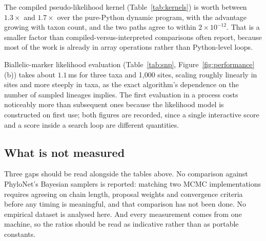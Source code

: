 The compiled pseudo-likelihood kernel (Table~\ref{tab:kernels}) is worth
between $1.3\times$ and $1.7\times$ over the pure-Python dynamic program, with
the advantage growing with taxon count, and the two paths agree to within
$2 \times 10^{-12}$. That is a smaller factor than compiled-versus-interpreted
comparisons often report, because most of the work is already in array
operations rather than Python-level loops.

Biallelic-marker likelihood evaluation (Table~\ref{tab:snp},
Figure~\ref{fig:performance}(b)) takes about $1.1$\,ms for three taxa and
1{,}000 sites, scaling roughly linearly in sites and more steeply in taxa, as
the exact algorithm's dependence on the number of sampled lineages implies. The
first evaluation in a process costs noticeably more than subsequent ones
because the likelihood model is constructed on first use; both figures are
recorded, since a single interactive score and a score inside a search loop are
different quantities.

\begin{table}[t]
  \centering
  \small
  
  \caption{Exact biallelic-marker likelihood of a fixed network, median of
  repeated evaluations with the likelihood model already constructed. The
  single-evaluation cost, which includes that construction, is recorded
  alongside these figures in .}
  \label{tab:snp}
\end{table}

\subsection{What is not measured}

Three gaps should be read alongside the tables above. No comparison against
PhyloNet's Bayesian samplers is reported: matching two MCMC implementations
requires agreeing on chain length, proposal weights and convergence criteria
before any timing is meaningful, and that comparison has not been done.
No empirical dataset is analysed here. And every measurement comes from one
machine, so the ratios should be read as indicative rather than as portable
constants.
